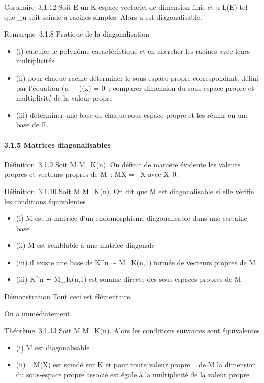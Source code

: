 \documentclass[]{article}
\begin{document}
Corollaire~3.1.12 Soit E un K-espace vectoriel de dimension finie et u \in
L(E) tel que \chi\_u soit scindé à racines simples. Alors u est
diagonalisable.

Remarque~3.1.8 Pratique de la diagonalisation

\begin{itemize}
\itemsep1pt\parskip0pt
\item
  (i) calculer le polynôme caractéristique et en chercher les racines
  avec leurs multiplicités
\item
  (ii) pour chaque racine déterminer le sous-espace propre
  correspondant, défini par l'équation (u -
  \lambda~\mathrmId)(x) = 0~; comparer dimension du
  sous-espace propre et multiplicité de la valeur propre
\item
  (iii) déterminer une base de chaque sous-espace propre et les réunir
  en une base de E.
\end{itemize}

\paragraph{3.1.5 Matrices diagonalisables}

Définition~3.1.9 Soit M \in M\_K(n). On définit de manière
évidente les valeurs propres et vecteurs propres de M~: MX = \lambda~X avec
X\neq~0.

Définition~3.1.10 Soit M \in M\_K(n). On dit que M est
diagonalisable si elle vérifie les conditions équivalentes

\begin{itemize}
\itemsep1pt\parskip0pt
\item
  (i) M est la matrice d'un endomorphisme diagonalisable dans une
  certaine base
\item
  (ii) M est semblable à une matrice diagonale
\item
  (iii) il existe une base de K^n ∼ M\_K(n,1) formée
  de vecteurs propres de M
\item
  (iii) K^n ∼ M\_K(n,1) est somme directe des
  sous-espaces propres de M
\end{itemize}

Démonstration Tout ceci est élémentaire.

On a immédiatement

Théorème~3.1.13 Soit M \in M\_K(n). Alors les conditions suivantes
sont équivalentes

\begin{itemize}
\itemsep1pt\parskip0pt
\item
  (i) M est diagonalisable
\item
  (ii) \chi\_M(X) est scindé sur K et pour toute valeur propre \lambda~ de
  M la dimension du sous-espace propre associé est égale à la
  multiplicité de la valeur propre.
\end{itemize}
\end{document}
